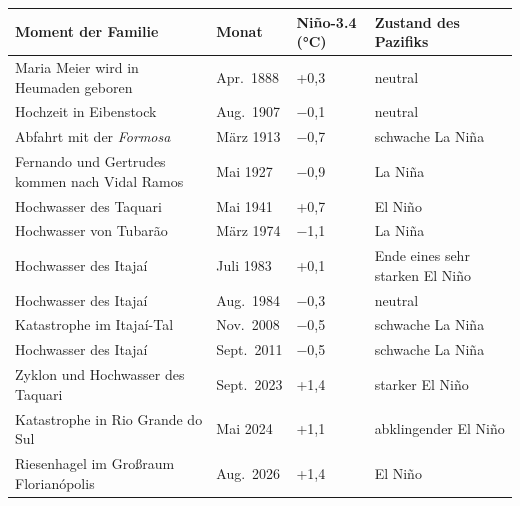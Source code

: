 \documentclass[
  ngerman,
  11pt,
  openany]{book}
\newcounter{none} %
\begin{document}
{\def\LTcaptype{none} %
\begin{longtable}[]{@{}
  >{\raggedright\arraybackslash}p{}
  >{\centering\arraybackslash}p{}
  >{\centering\arraybackslash}p{}
  >{\raggedright\arraybackslash}p{}@{}}
\toprule\noalign{}
\begin{minipage}[b]{\linewidth}\raggedright
Moment der Familie
\end{minipage} & \begin{minipage}[b]{\linewidth}\centering
Monat
\end{minipage} & \begin{minipage}[b]{\linewidth}\centering
Niño-3.4 (°C)
\end{minipage} & \begin{minipage}[b]{\linewidth}\raggedright
Zustand des Pazifiks
\end{minipage} \\
\midrule\noalign{}
\endhead
\bottomrule\noalign{}
\endlastfoot
Maria Meier\index[pessoas]{meier, maria@Meier, Maria} wird in Heumaden\index[lugares]{heumaden@Heumaden} geboren & Apr.~1888 & +0,3 & neutral \\
Hochzeit in Eibenstock\index[lugares]{eibenstock@Eibenstock} & Aug.~1907 & −0,1 & neutral \\
Abfahrt mit der \emph{Formosa} & März 1913 & −0,7 & schwache La Niña \\
Fernando und Gertrudes kommen nach Vidal Ramos\index[lugares]{vidal ramos@Vidal Ramos} & Mai 1927 & −0,9 & La
Niña \\
Hochwasser des Taquari & Mai 1941 & +0,7 & El Niño \\
Hochwasser von Tubarão\index[lugares]{tubarao@Tubarão} & März 1974 & −1,1 & La Niña \\
Hochwasser des Itajaí\index[lugares]{itajai@Itajaí} & Juli 1983 & +0,1 & Ende eines sehr starken El
Niño \\
Hochwasser des Itajaí\index[lugares]{itajai@Itajaí} & Aug.~1984 & −0,3 & neutral \\
Katastrophe im Itajaí\index[lugares]{itajai@Itajaí}-Tal & Nov.~2008 & −0,5 & schwache La Niña \\
Hochwasser des Itajaí\index[lugares]{itajai@Itajaí} & Sept.~2011 & −0,5 & schwache La Niña \\
Zyklon und Hochwasser des Taquari & Sept.~2023 & +1,4 & starker El
Niño \\
Katastrophe in Rio Grande do Sul & Mai 2024 & +1,1 & abklingender El
Niño \\
Riesenhagel im Großraum Florianópolis\index[lugares]{florianopolis@Florianópolis} & Aug.~2026 & +1,4 & El Niño \\
\end{longtable}
}
\end{document}
